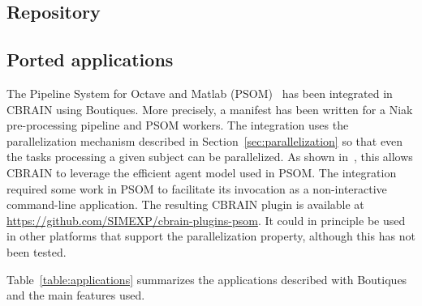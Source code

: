 \documentclass{article}
\begin{document}
\subsection{Repository}

\subsection{Ported applications}


The Pipeline System for Octave and Matlab
(PSOM)~\cite{bellec2012pipeline} has been integrated in CBRAIN using
Boutiques. More precisely, a manifest has been written for a Niak
pre-processing pipeline and PSOM workers. The integration uses the
parallelization mechanism described in
Section~\ref{sec:parallelization} so that even the tasks processing a
given subject can be parallelized. As shown in~\cite{GLAT-16}, this
allows CBRAIN to leverage the efficient agent model used in PSOM. The
integration required some work in PSOM to facilitate its invocation as
a non-interactive command-line application. The resulting CBRAIN
plugin is available at
\url{https://github.com/SIMEXP/cbrain-plugins-psom}. It could in
principle be used in other platforms that support the parallelization
property, although this has not been tested.


Table~\ref{table:applications} summarizes the applications described
with Boutiques and the main features used.
\end{document}
